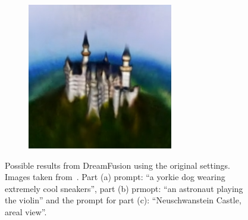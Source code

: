 \begin{figure}[ht]
\begin{subfigure}[b]{0.3\textwidth}
        \caption{}
    \end{subfigure}
    \begin{subfigure}[b]{0.3\textwidth}
        \centering
        \includegraphics[width=\textwidth]{figures/appendix/dreamfusion_neuschwanstein.PNG}
        \caption{}
    \end{subfigure}
    \caption{Possible results from DreamFusion using the original settings. Images taken from~\citep{pooleDreamfusion}. Part (a) prompt: ``a yorkie dog wearing extremely cool sneakers'', part (b) prmopt: ``an astronaut playing the violin'' and the prompt for part (c): ``Neuschwanstein Castle, areal view''.}\label{fig:dreamfusionOriginal}
\end{figure}


